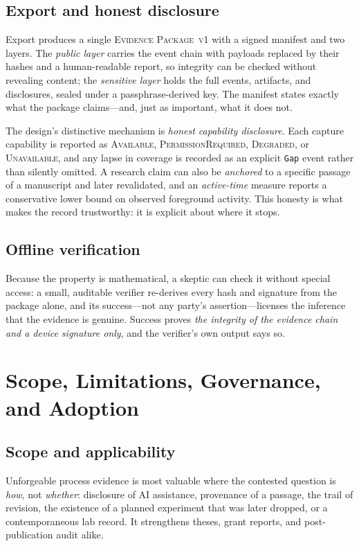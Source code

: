 \documentclass[11pt]{article}
\newcommand{\evpkg}{\textsc{Evidence Package~v1}\xspace}
\begin{document}
\subsection{Export and honest disclosure}

Export produces a single \evpkg with a signed manifest and two layers. The \emph{public
layer} carries the event chain with payloads replaced by their hashes and a
human-readable report, so integrity can be checked without revealing content; the
\emph{sensitive layer} holds the full events, artifacts, and disclosures, sealed under
a passphrase-derived key. The manifest states exactly what the package claims---and,
just as important, what it does not.

The design's distinctive mechanism is \emph{honest capability disclosure}. Each capture
capability is reported as \textsc{Available}, \textsc{PermissionRequired},
\textsc{Degraded}, or \textsc{Unavailable}, and any lapse in coverage is recorded as an
explicit \texttt{Gap} event rather than silently omitted. A research
claim can also be \emph{anchored} to a specific passage of a manuscript and later
revalidated, and an \emph{active-time} measure reports a conservative lower bound on
observed foreground activity. This honesty is what makes the record trustworthy: it is
explicit about where it stops.

\subsection{Offline verification}

Because the property is mathematical, a skeptic can check it without special access: a
small, auditable verifier re-derives every hash and signature from the package alone,
and its success---not any party's assertion---licenses the inference that the evidence
is genuine. Success proves \emph{the integrity of the evidence chain and a device
signature only}, and the verifier's own output says so.

\section{Scope, Limitations, Governance, and Adoption}
\label{sec:scope}

\subsection{Scope and applicability}

Unforgeable process evidence is most valuable where the contested question is \emph{how},
not \emph{whether}: disclosure of AI assistance, provenance of a passage, the trail of
revision, the existence of a planned experiment that was later dropped, or a
contemporaneous lab record. It strengthens theses, grant reports, and post-publication
audit alike.
\end{document}
